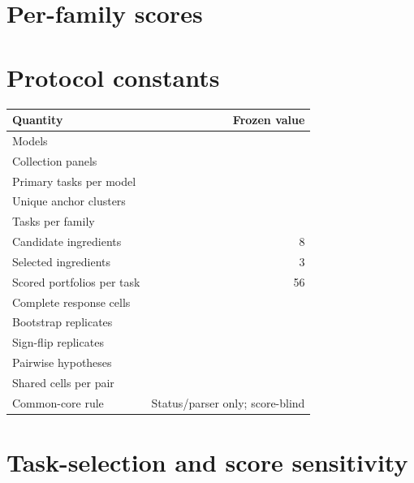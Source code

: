 \documentclass[10pt,twocolumn]{article}
\begin{document}
\section{Per-family scores}

\begin{center}
  \centering
  \scriptsize
  \setlength{\tabcolsep}{4pt}
  
\end{center}

\section{Protocol constants}

\begin{center}
  \centering
  \footnotesize
  \begin{tabular}{@{}l r@{}}
    \toprule
    Quantity & Frozen value \\
    \midrule
    Models & \FBModels{} \\
    Collection panels & \FBPanelCount{} \\
    Primary tasks per model & \FBTasks{} \\
    Unique anchor clusters & \FBUniqueAnchors{} \\
    Tasks per family & \FBTasksPerFamily{} \\
    Candidate ingredients & 8 \\
    Selected ingredients & 3 \\
    Scored portfolios per task & 56 \\
    Complete response cells & \FBCompleteCells{} \\
    Bootstrap replicates & \FBBootstrapResamples{} \\
    Sign-flip replicates & \FBPermutationResamples{} \\
    Pairwise hypotheses & \FBPairs{} \\
    Shared cells per pair & \FBTasks{} \\
    Common-core rule & Status/parser only; score-blind \\
    \bottomrule
  \end{tabular}
\end{center}

\section{Task-selection and score sensitivity}
\label{app:robustness}
\end{document}
